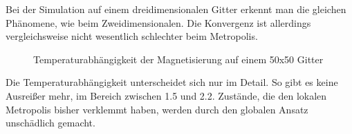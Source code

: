 Bei der Simulation auf einem dreidimensionalen Gitter erkennt man die gleichen Phänomene, wie beim Zweidimensionalen. Die Konvergenz ist allerdings vergleichsweise nicht wesentlich schlechter beim Metropolis.

\begin{figure}[H]
	\centering
	\caption{Temperaturabhängigkeit der Magnetisierung auf einem 50x50 Gitter}
	\label{}
\end{figure}

Die Temperaturabhängigkeit unterscheidet sich nur im Detail. So gibt es keine Ausreißer mehr, im Bereich zwischen 1.5 und 2.2. Zustände, die den lokalen Metropolis bisher verklemmt haben, werden durch den globalen Ansatz unschädlich gemacht. 
